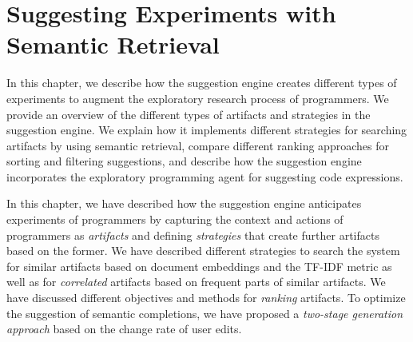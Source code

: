 
\chapter{Suggesting Experiments with Semantic Retrieval}
\label{cha:suggestions}

In this chapter, we describe how the suggestion engine creates different types of experiments to augment the exploratory research process of programmers.
We provide an overview of the different types of artifacts and strategies in the suggestion engine.
We explain how it implements different strategies for searching artifacts by using semantic retrieval, compare different ranking approaches for sorting and filtering suggestions, and describe how the suggestion engine incorporates the exploratory programming agent for suggesting code expressions.


\begin{summary}
	In this chapter, we have described how the suggestion engine anticipates experiments of programmers by capturing the context and actions of programmers as \emph{artifacts} and defining \emph{strategies} that create further artifacts based on the former.
	We have described different strategies to search the system for similar artifacts based on document embeddings and the TF-IDF metric as well as for \emph{correlated} artifacts based on frequent parts of similar artifacts.
	We have discussed different objectives and methods for \emph{ranking} artifacts.
	To optimize the suggestion of semantic completions, we have proposed a \emph{two-stage generation approach} based on the change rate of user edits.
\end{summary}
